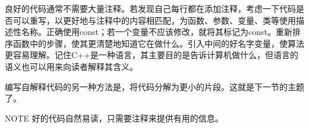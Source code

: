 
良好的代码通常不需要大量注释。若发现自己每行都在添加注释，考虑一下代码是否可以重写，以更好地与注释中的内容相匹配，为函数、参数、变量、类等使用描述性名称。正确使用const；若一个变量不应该修改，就将其标记为const。重新排序函数中的步骤，使其更清楚地知道它在做什么。引入中间的好名字变量，使算法更容易理解。记住C++是一种语言，其主要目的是告诉计算机做什么，但语言的语义也可以用来向读者解释其含义。

编写自解释代码的另一种方法是，将代码分解为更小的片段。这就是下一节的主题了。

\begin{myNotic}{NOTE}
好的代码自然易读，只需要注释来提供有用的信息。
\end{myNotic}



















